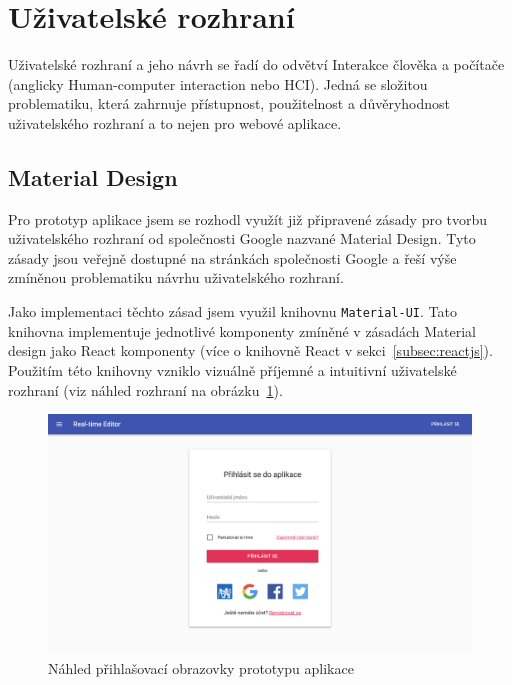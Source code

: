 
\section{Uživatelské rozhraní}\label{sec:uživatelskéRozhraní}

Uživatelské rozhraní a jeho návrh se řadí do odvětví Interakce člověka a počítače (anglicky Human-computer interaction nebo HCI).
Jedná se složitou problematiku, která zahrnuje přístupnost, použitelnost a důvěryhodnost uživatelského rozhraní a to nejen pro webové aplikace.

\subsection{Material Design}\label{subsec:materialDesign}

Pro prototyp aplikace jsem se rozhodl využít již připravené zásady pro tvorbu uživatelského rozhraní od společnosti Google nazvané Material Design.
Tyto zásady jsou veřejně dostupné na stránkách společnosti Google a řeší výše zmíněnou problematiku návrhu uživatelského rozhraní.~\cite{google:md}

Jako implementaci těchto zásad jsem využil knihovnu \texttt{Material-UI}.
Tato knihovna implementuje jednotlivé komponenty zmíněné v zásadách Material design jako React komponenty (více o knihovně React v sekci~\ref{subsec:reactjs}).
Použitím této knihovny vzniklo vizuálně příjemné a intuitivní uživatelské rozhraní (viz náhled rozhraní na obrázku~\ref{fig:uiScreenshot}).

\begin{figure}[ht!]
    \centering
    \includegraphics[width=\textwidth]{partials/realizace/uiScreenshotCZ.png}
    \caption{Náhled přihlašovací obrazovky prototypu aplikace}\label{fig:uiScreenshot}
\end{figure}

